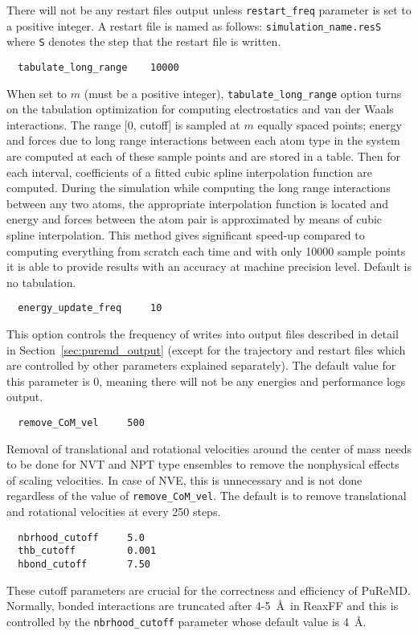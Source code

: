 \documentclass{article}
\begin{document}
There will not be any restart files output unless {\tt restart\_freq} 
parameter is set to a positive integer. A restart file is named as follows: 
{\tt simulation\_name.resS} where {\tt S} denotes the step that the restart 
file is written.

\begin{verbatim}
  tabulate_long_range    10000
\end{verbatim}
When set to $m$ (must be a positive integer), {\tt tabulate\_long\_range} 
option turns on the tabulation optimization for computing electrostatics and 
van der Waals interactions. The range [0, cutoff] is sampled at $m$ equally 
spaced points; energy and forces due to long range interactions between each 
atom type in the system are computed at each of these sample points and 
are stored in a table. Then for each interval, coefficients of a fitted
cubic spline interpolation function are computed. During the simulation 
while computing the long range interactions between any two atoms, 
the appropriate interpolation function is located and energy and forces 
between the atom pair is approximated by means of cubic spline interpolation.
This method gives significant speed-up compared to computing everything from 
scratch each time and with only 10000 sample points it is able to provide 
results with an accuracy at machine precision level. Default is no tabulation.

\begin{verbatim}
  energy_update_freq     10
\end{verbatim}
This option controls the frequency of writes into output files described 
in detail in Section~\ref{sec:puremd_output} (except for the trajectory 
and restart files which are controlled by other parameters explained
separately). The default value for this parameter is 0, meaning there will 
not be any energies and performance logs output.

\begin{verbatim}
  remove_CoM_vel     500
\end{verbatim}
Removal of translational and rotational velocities around the center of 
mass needs to be done for NVT and NPT type ensembles to remove the 
nonphysical effects of scaling velocities. In case of NVE, this is  
unnecessary and is not done regardless of the value of {\tt remove\_CoM\_vel}.
The default is to remove translational and rotational velocities at 
every 250 steps.

\begin{verbatim}
  nbrhood_cutoff     5.0     
  thb_cutoff         0.001   
  hbond_cutoff       7.50
\end{verbatim}
These cutoff parameters are crucial for the correctness and efficiency
of PuReMD. Normally, bonded interactions are truncated after 4-5~\AA\ in 
ReaxFF and this is controlled by the {\tt nbrhood\_cutoff} parameter 
whose default value is 4~\AA.
\end{document}
